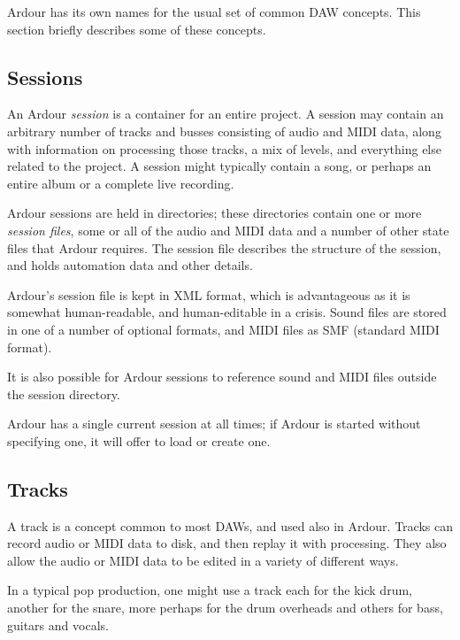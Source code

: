 \documentclass[10pt,a4paper]{book}
\begin{document}
Ardour has its own names for the usual set of common DAW concepts.
This section briefly describes some of these concepts.


\subsection{Sessions}

An Ardour \emph{session} is a container for an entire project.  A
session may contain an arbitrary number of tracks and busses
consisting of audio and MIDI data, along with information on processing
those tracks, a mix of levels, and everything else related to the
project.  A session might typically contain a song, or perhaps an entire
album or a complete live recording.

Ardour sessions are held in directories; these directories contain one
or more \emph{session files}, some or all of the audio and MIDI data
and a number of other state files that Ardour requires.  The session
file describes the structure of the session, and holds automation data
and other details.

\begin{danger}
Ardour's session file is kept in XML format, which is advantageous as
it is somewhat human-readable, and human-editable in a crisis.  Sound
files are stored in one of a number of optional formats, and MIDI
files as SMF (standard MIDI format).

It is also possible for Ardour sessions to reference sound and MIDI
files outside the session directory.
\end{danger}

Ardour has a single current session at all times; if Ardour is started
without specifying one, it will offer to load or create one.



\subsection{Tracks}

A track is a concept common to most DAWs, and used also in Ardour.
Tracks can record audio or MIDI data to disk, and then replay it with
processing.  They also allow the audio or MIDI data to be edited in a
variety of different ways.

In a typical pop production, one might use a track each for the kick
drum, another for the snare, more perhaps for the drum overheads and
others for bass, guitars and vocals.
\end{document}
